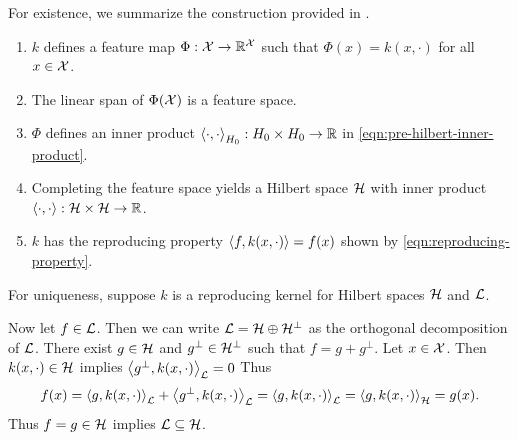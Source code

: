 For existence, we summarize the construction provided in .
\begin{enumerate}
    \item \(k\) defines a feature map \(\Phi : \mathcal{X} \to \mathbb{R}^{\mathcal{X}}\) such that \(\Phi(x) = k(x, \cdot)\) for all \(x \in \mathcal{X}\).
    \item The linear span of \(\Phi(\mathcal{X})\) is a feature space.
    \item \(\Phi\) defines an inner product \(\left\langle \cdot, \cdot \right\rangle_{H_0} : H_0 \times H_0 \to \mathbb{R}\) in \cref{eqn:pre-hilbert-inner-product}.
    \item Completing the feature space yields a Hilbert space \(\mathcal{H}\) with inner product \(\left\langle \cdot, \cdot \right\rangle : \mathcal{H} \times \mathcal{H} \to \mathbb{R}\).
    \item \(k\) has the reproducing property \(\left\langle f, k(x,\cdot) \right\rangle = f(x)\) shown by \cref{eqn:reproducing-property}.
\end{enumerate}
\def\L{\hilbert{L}}
\def\Hp{\H^{\perp}}
For uniqueness, suppose \(k\) is a reproducing kernel for Hilbert spaces \(\mathcal{H}\) and \(\L\).


Now let \(f \in \L\).
Then we can write \(\L = \H \oplus \Hp\) as the orthogonal decomposition of \(\L\).
There exist \(g \in \mathcal{H}\) and \(g^\perp \in \Hp\) such that \(f = g + g^\perp\).
Let \(x \in \mathcal{X}\).
Then \(k(x,\cdot) \in \mathcal{H}\) implies \(\ipt{g^\perp,k(x,\cdot)}_{\L} = 0\)
Thus
\begin{equation}
    f(x)
    = \ipt{g,k(x,\cdot)}_{\L} + \ipt{g^\perp,k(x,\cdot)}_{\L}
    = \ipt{g,k(x,\cdot)}_{\L}
    = \ipt{g,k(x,\cdot)}_{\H}
    = g(x).
\end{equation}
Thus \(f = g \in \mathcal{H}\) implies \(\L \subseteq \H\).